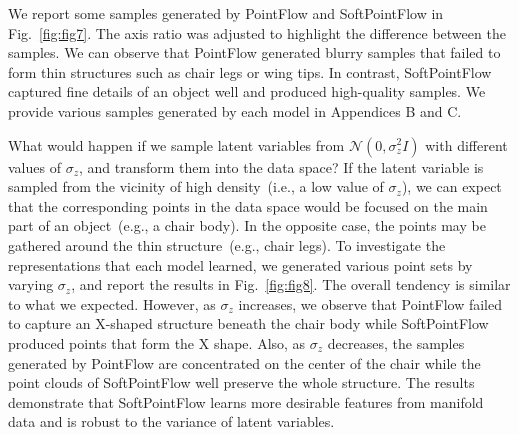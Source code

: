 \documentclass{article}
\begin{document}
We report some samples generated by PointFlow and SoftPointFlow in Fig.~\ref{fig:fig7}. The axis ratio was adjusted to highlight the difference between the samples. We can observe that PointFlow generated blurry samples that failed to form thin structures such as chair legs or wing tips. In contrast, SoftPointFlow captured fine details of an object well and produced high-quality samples. We provide various samples generated by each model in Appendices B and C. 

What would happen if we sample latent variables from $\mathcal{N}(0,\sigma_{z}^{2}I)$ with different values of $\sigma_{z}$, and transform them into the data space? If the latent variable is sampled from the vicinity of high density~(i.e., a low value of $\sigma_{z}$), we can expect that the corresponding points in the data space would be focused on the main part of an object~(e.g., a chair body). In the opposite case, the points may be gathered around the thin structure~(e.g., chair legs). To investigate the representations that each model learned, we generated various point sets by varying $\sigma_{z}$, and report the results in Fig.~\ref{fig:fig8}. The overall tendency is similar to what we expected. However, as $\sigma_{z}$ increases, we observe that PointFlow failed to capture an X-shaped structure beneath the chair body while SoftPointFlow produced points that form the X shape. Also, as $\sigma_{z}$ decreases, the samples generated by PointFlow are concentrated on the center of the chair while the point clouds of SoftPointFlow well preserve the whole structure. The results demonstrate that SoftPointFlow learns more desirable features from manifold data and is robust to the variance of latent variables.
\end{document}
